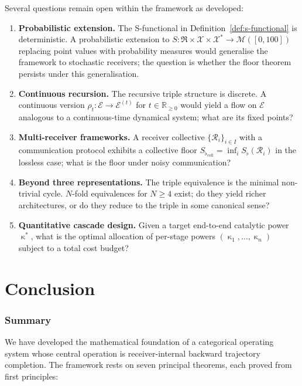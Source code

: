 \documentclass[twocolumn,a4paper]{article}
\DeclareMathOperator{\catpow}{\kappa}
\newcommand{\Real}{\mathbb{R}}
\newcommand{\Cands}{\mathcal{X}}
\newcommand{\Truth}{\mathcal{X}^{*}}
\newcommand{\Expr}{\mathcal{E}}
\newcommand{\receiver}{\mathcal{R}}
\newcommand{\Receiver}{\mathfrak{R}}
\newcommand{\Sscalar}{S}
\newcommand{\Sfloor}{S_{\flat}}
\begin{document}
Several questions remain open within the framework as developed:
\begin{enumerate}[nosep,leftmargin=*]
\item \textbf{Probabilistic extension.} The S-functional in Definition~\ref{def:s-functional} is deterministic. A probabilistic extension to $\Sscalar\colon\Receiver\times\Cands\times\Truth\to\mathcal{M}([0,100])$ replacing point values with probability measures would generalise the framework to stochastic receivers; the question is whether the floor theorem persists under this generalisation.
\item \textbf{Continuous recursion.} The recursive triple structure is discrete. A continuous version $\rho_{t}\colon\Expr\to\Expr^{(t)}$ for $t\in\Real_{\geq 0}$ would yield a flow on $\Expr$ analogous to a continuous-time dynamical system; what are its fixed points?
\item \textbf{Multi-receiver frameworks.} A receiver collective $\{\receiver_{i}\}_{i\in I}$ with a communication protocol exhibits a collective floor $\Sfloor_{\text{coll}}=\inf_{i}\Sfloor(\receiver_{i})$ in the lossless case; what is the floor under noisy communication?
\item \textbf{Beyond three representations.} The triple equivalence is the minimal non-trivial cycle. $N$-fold equivalences for $N\geq 4$ exist; do they yield richer architectures, or do they reduce to the triple in some canonical sense?
\item \textbf{Quantitative cascade design.} Given a target end-to-end catalytic power $\catpow^{*}$, what is the optimal allocation of per-stage powers $(\catpow_{1},\ldots,\catpow_{n})$ subject to a total cost budget?
\end{enumerate}

\part{Conclusion}

\section{Summary}

We have developed the mathematical foundation of a categorical operating system whose central operation is receiver-internal backward trajectory completion. The framework rests on seven principal theorems, each proved from first principles:
\end{document}
